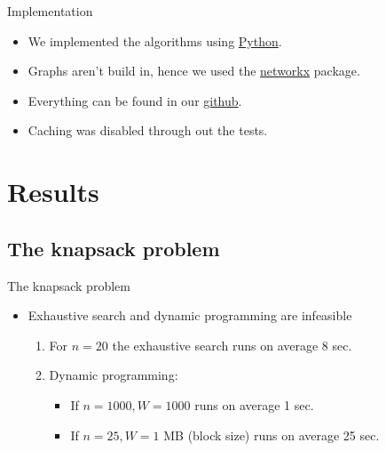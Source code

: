 \documentclass{beamer}
\begin{document}
\begin{frame}{Implementation}
    \begin{itemize}
        \item {We implemented the algorithms using 
        \href{https://www.python.org/}{Python}.}
        \item {Graphs aren't build in, hence we used the 
        \href{https://networkx.github.io/}{networkx} package.}
        \item {Everything can be found in our 
        \href{https://besartdollma.github.io/Increasing-profit-from-fees-of-cryptocurrencies/}{github}.}
        \item {Caching was disabled through out the tests.}
    \end{itemize}
\end{frame}

\section{Results}
\subsection*{The knapsack problem}
\begin{frame}{The knapsack problem}{}  %
    \begin{itemize}
        \item{Exhaustive search and dynamic programming are infeasible}
            \begin{enumerate}
                \item {For $n=20$ the exhaustive search runs on average 8 sec.}
                \item {Dynamic programming:}
                \begin{itemize}
                    \item {If $n=1000, W=1000$ runs on average 1 sec.}
                    \item {If $n =25, W = 1 $ MB (block size) runs on average 25 sec.}
                \end{itemize}
            \end{enumerate}
    \end{itemize}
\end{frame}
\end{document}
